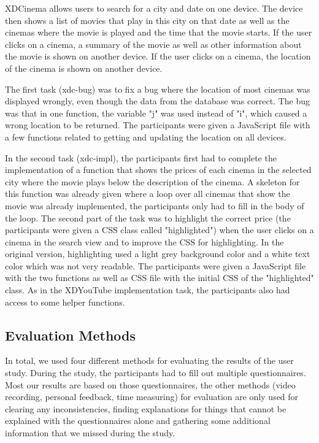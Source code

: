 XDCinema allows users to search for a city and date on one device. The device then shows a list of movies that play in this city on that date as well as the cinemas where the movie is played and the time that the movie starts. If the user clicks on a cinema, a summary of the movie as well as other information about the movie is shown on another device. If the user clicks on a cinema, the location of the cinema is shown on another device.

The first task (xdc-bug) was to fix a bug where the location of most cinemas was displayed wrongly, even though the data from the database was correct. The bug was that in one function, the variable "j" was used instead of "i", which caused a wrong location to be returned. The participants were given a JavaScript file with a few functions related to getting and updating the location on all devices.

In the second task (xdc-impl), the participants first had to complete the implementation of a function that shows the prices of each cinema in the selected city where the movie plays below the description of the cinema. A skeleton for this function was already given where a loop over all cinemas that show the movie was already implemented, the participants only had to fill in the body of the loop. The second part of the task was to highlight the correct price (the participants were given a CSS class called "highlighted") when the user clicks on a cinema in the search view and to improve the CSS for highlighting. In the original version, highlighting used a light grey background color and a white text color which was not very readable. The participants were given a JavaScript file with the two functions as well as CSS file with the initial CSS of the "highlighted" class. As in the XDYouTube implementation task, the participants also had access to some helper functions.

\subsection{Evaluation Methods}

In total, we used four different methods for evaluating the results of the user study. During the study, the participants had to fill out multiple questionnaires. Most our results are based on those questionnaires, the other methods (video recording, personal feedback, time measuring) for evaluation are only used for clearing any inconsistencies, finding explanations for things that cannot be explained with the questionnaires alone and gathering some additional information that we missed during the study.

